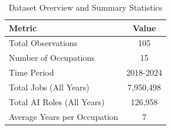 \begin{table}[htbp]
\caption{Dataset Overview and Summary Statistics}
\label{tab:dataset_overview}
\begin{tabular}{lc}
\hline\hline
Metric & Value \\
\hline
Total Observations & 105 \\
Number of Occupations & 15 \\
Time Period & 2018-2024 \\
Total Jobs (All Years) & 7,950,498 \\
Total AI Roles (All Years) & 126,958 \\
Average Years per Occupation & 7 \\
\hline\hline
\end{tabular}
\end{table}
